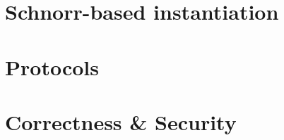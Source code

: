 \section{Schnorr-based instantiation} \label{sec:sig:schnorr-inst}


\section{Protocols} \label{sec:sig:protocols}


\section{Correctness \& Security}\label{sec:sig:two-party-apt-security}

